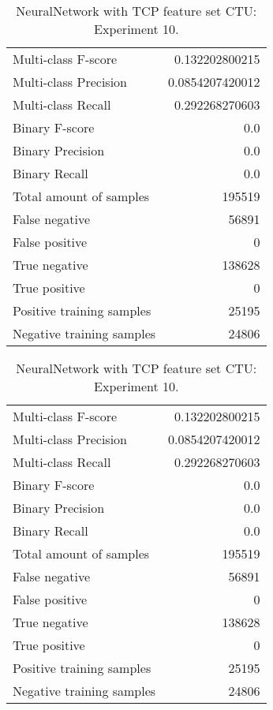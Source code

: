 \begin{table}[H]
\begin{minipage}{0.5\textwidth}
\caption{NeuralNetwork with TCP feature set CTU: \\Experiment 9.}
\centering
\begin{tabular}{l r}
\toprule
Multi-class F-score & 0.132202800215 \\
Multi-class Precision & 0.0854207420012 \\
Multi-class Recall & 0.292268270603 \\
\midrule
Binary F-score & 0.0 \\
Binary Precision & 0.0 \\
Binary Recall & 0.0 \\
\midrule
Total amount of samples & 195519 \\
False negative & 56891 \\
False positive & 0 \\
True negative & 138628 \\
True positive & 0 \\
\midrule
Positive training samples & 25195 \\
Negative training samples & 24806 \\
\bottomrule
\end{tabular}
\end{minipage}
\hfillx
\begin{minipage}{0.5\textwidth}
\caption{NeuralNetwork with TCP feature set CTU: \\Experiment 10.}
\centering
\begin{tabular}{l r}
\toprule
Multi-class F-score & 0.132202800215 \\
Multi-class Precision & 0.0854207420012 \\
Multi-class Recall & 0.292268270603 \\
\midrule
Binary F-score & 0.0 \\
Binary Precision & 0.0 \\
Binary Recall & 0.0 \\
\midrule
Total amount of samples & 195519 \\
False negative & 56891 \\
False positive & 0 \\
True negative & 138628 \\
True positive & 0 \\
\midrule
Positive training samples & 25195 \\
Negative training samples & 24806 \\
\bottomrule
\end{tabular}
\end{minipage}
\end{table}
